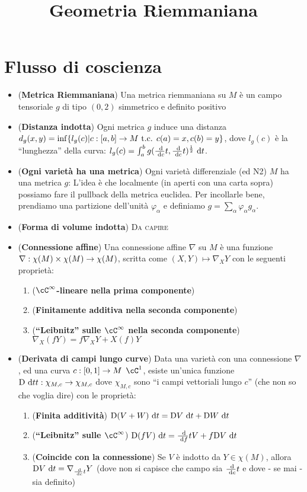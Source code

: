 \documentclass[a4paper,NoNotes,GeneralMath]{stdmdoc}
\newcommand{\Dde}[1]{\ensuremath{\text{D} {#1}}{\de t}}
\newcommand{\todo}{{\scshape Da capire}}
\begin{document}
\title{Geometria Riemmaniana}

\section*{Flusso di coscienza}
\begin{itemize}
\item ({\bf Metrica Riemmaniana}) Una metrica riemmaniana su $M$ è un campo tensoriale $g$ di tipo $(0, 2)$ simmetrico e definito positivo
\item ({\bf Distanza indotta}) Ogni metrica $g$ induce una distanza $d_g (x, y) = \inf \{ l_g (c) | c: [a, b] \rightarrow M \mbox{ t.c. } c(a) = x, c(b) = y\}$, dove $l_g(c)$ è la ``lunghezza'' della curva: $l_g(c) = \int_a^b g(\dde{c}{t}, \dde{c}{t})^\frac{1}{2} \de t$.
\item ({\bf Ogni varietà ha una metrica}) Ogni varietà differenziale (ed N2) $M$ ha una metrica $g$: L'idea è che localmente (in aperti con una carta sopra) possiamo fare il pullback della metrica euclidea. Per incollarle bene, prendiamo una partizione dell'unità $\varphi_\alpha$ e definiamo $g = \sum_\alpha \varphi_\alpha g_\alpha$.
\item ({\bf Forma di volume indotta}) \todo
\item ({\bf Connessione affine}) Una connessione affine $\nabla$ su $M$ è una funzione $\nabla: \chi(M) \times \chi(M) \rightarrow \chi(M)$, scritta come $(X, Y) \mapsto \nabla_X Y$ con le seguenti proprietà:
  \begin{enumerate}
  \item ({\bf $\cC^\infty$-lineare nella prima componente})
  \item ({\bf Finitamente additiva nella seconda componente})
  \item ({\bf ``Leibnitz'' sulle $\cC^\infty$ nella seconda componente}) $\nabla_X (fY) = f \nabla_X Y + X(f) Y$
  \end{enumerate}
\item ({\bf Derivata di campi lungo curve}) Data una varietà con una connessione $\nabla$, ed una curva $c: [0, 1] \rightarrow M$ $\cC^1$, esiste un'unica funzione $\Dde{}{t} : \chi_{M, c} \rar \chi_{M, c}$ dove $\chi_{M, c}$ sono ``i campi vettoriali lungo $c$'' (che non so che voglia dire) con le proprietà:
  \begin{enumerate}
  \item ({\bf Finita additività}) $\Dde{(V + W)} = \Dde{V} + \Dde{W}$
  \item ({\bf ``Leibnitz'' sulle $\cC^\infty$}) $\Dde{(fV)} = \dde{f}{t} V + f \Dde{V}$
  \item ({\bf Coincide con la connessione}) Se $V$ è indotto da $Y \in \chi(M)$, allora $\Dde{V} = \nabla_{\dde{c}{t}} Y$ (dove non si capisce che campo sia $\frac{\text{ d}}{\text{ d} c}{t}$ e dove - se mai - sia definito)
  \end{enumerate}


\end{itemize}
\end{document}
